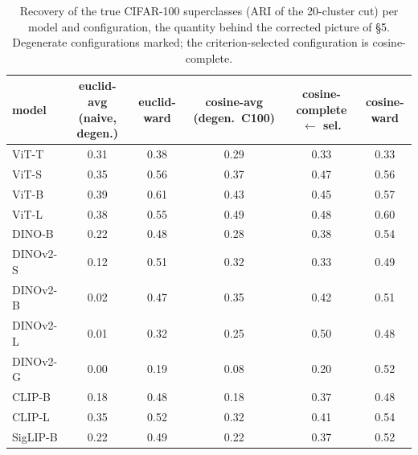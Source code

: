 \begin{table}[H]
\centering
\scriptsize
\begin{tabular}{lccccc}
\toprule
model & euclid-avg (naive, degen.) & euclid-ward & cosine-avg (degen.\ C100) & cosine-complete $\leftarrow$ sel. & cosine-ward \\
\midrule
ViT-T & 0.31 & 0.38 & 0.29 & 0.33 & 0.33 \\
ViT-S & 0.35 & 0.56 & 0.37 & 0.47 & 0.56 \\
ViT-B & 0.39 & 0.61 & 0.43 & 0.45 & 0.57 \\
ViT-L & 0.38 & 0.55 & 0.49 & 0.48 & 0.60 \\
DINO-B & 0.22 & 0.48 & 0.28 & 0.38 & 0.54 \\
DINOv2-S & 0.12 & 0.51 & 0.32 & 0.33 & 0.49 \\
DINOv2-B & 0.02 & 0.47 & 0.35 & 0.42 & 0.51 \\
DINOv2-L & 0.01 & 0.32 & 0.25 & 0.50 & 0.48 \\
DINOv2-G & 0.00 & 0.19 & 0.08 & 0.20 & 0.52 \\
CLIP-B & 0.18 & 0.48 & 0.18 & 0.37 & 0.48 \\
CLIP-L & 0.35 & 0.52 & 0.32 & 0.41 & 0.54 \\
SigLIP-B & 0.22 & 0.49 & 0.22 & 0.37 & 0.52 \\
\bottomrule
\end{tabular}
\caption{Recovery of the true CIFAR-100 superclasses (ARI of the 20-cluster cut) per model and configuration, the quantity behind the corrected picture of \S5. Degenerate configurations marked; the criterion-selected configuration is cosine-complete.}
\label{tab:b11-recovery}
\end{table}
